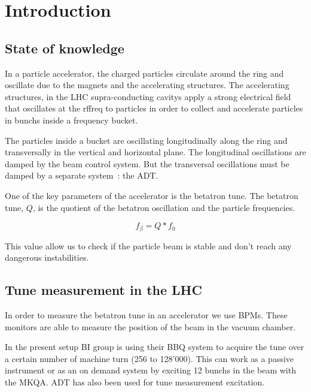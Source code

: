 %

\chapter{Introduction}

\section{State of knowledge}

In a particle accelerator, the charged particles circulate around the ring and oscillate due to the magnets and the accelerating structures. The accelerating structures, in the \gls{LHC} supra-conducting \glspl{cavity} apply a strong electrical field that oscillates at the \gls{rffreq} to particles in order to collect and accelerate particles in \glspl{bunch} inside a frequency \gls{bucket}.

The particles inside a bucket are oscillating longitudinally along the ring and transversally in the vertical and horizontal plane. The longitudinal oscillations are damped by the beam control system. But the transversal oscillations must be damped by a separate system~: the \gls{ADT}\cite{Benews11,Zhabitsky:1141925}.

One of the key parameters of the accelerator is the betatron tune. The betatron tune, $Q$, is the quotient of the betatron oscillation and the particle frequencies.

$$f_\beta = Q * f_0$$

This value allow us to check if the particle beam is stable and don't reach any dangerous instabilities.

\section{Tune measurement in the LHC}

In order to measure the betatron tune in an accelerator we use \glspl{BPM}. These monitors are able to measure the position of the beam in the vacuum chamber.

In the present setup \gls{BI} group is using their \gls{BBQ} \cite{Boccardi:1156349} system to acquire the tune over a certain number of machine turn (256 to 128'000). This can work as a passive instrument or as an on demand system by exciting 12 \glspl{bunch} in the beam with the \gls{MKQA}. \Gls{ADT} has also been used for tune measurement excitation\cite{HofleEvian10}. 

